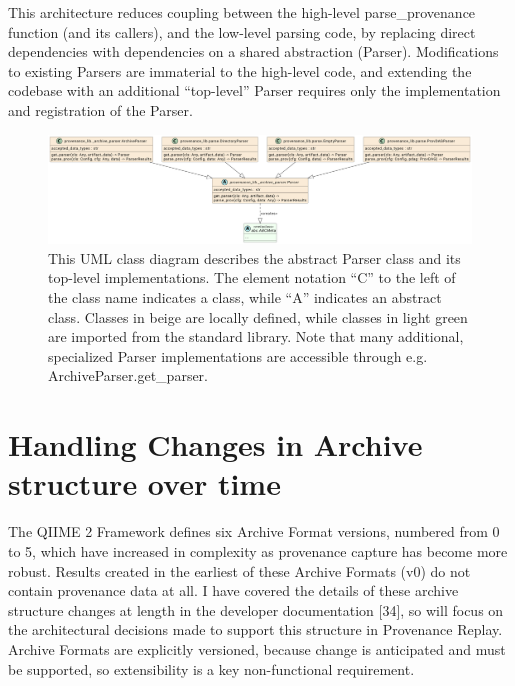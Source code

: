 This architecture reduces coupling between the high-level parse\_provenance
function (and its callers), and the low-level parsing code, by replacing direct
dependencies with dependencies on a shared abstraction (Parser). Modifications
to existing Parsers are immaterial to the high-level code, and extending the
codebase with an additional “top-level” Parser requires only the implementation
and registration of the Parser. 

\begin{figure}[htp]
\centering
\includegraphics[width=\textwidth]{figures/allParsersUML.png}
\caption[UML Class diagram of the abstract Parser class and its implementations]%
{This UML class diagram describes the abstract Parser class and its top-level
implementations. The element notation “C” to the left of the class name
indicates a class, while “A” indicates an abstract class. Classes in beige are
locally defined, while classes in light green are imported from the standard
library. Note that many additional, specialized Parser implementations are
accessible through e.g. ArchiveParser.get\_parser.}
\label{fig:allParsersUML}
\end{figure}

\section{Handling Changes in Archive structure over time}

The QIIME 2 Framework defines six Archive Format versions, numbered from 0 to 5,
which have increased in complexity as provenance capture has become more robust.
Results created in the earliest of these Archive Formats (v0) do not contain
provenance data at all. I have covered the details of these archive structure
changes at length in the developer documentation [34], so will focus on the
architectural decisions made to support this structure in Provenance Replay.
Archive Formats are explicitly versioned, because change is anticipated and must
be supported, so extensibility is a key non-functional requirement. 

